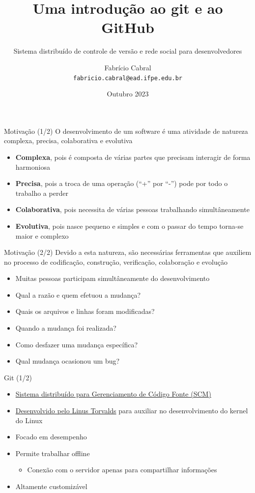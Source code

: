 \documentclass[aspectratio=169,14pt]{beamer}
\title{Uma introdução ao git e ao GitHub}
\subtitle{Sistema distribuído de controle de versão e rede social para
desenvolvedores}
\date{Outubro 2023}
\author[Fabrício Cabral]{
    Fabrício Cabral\texorpdfstring{\\\texttt{fabricio.cabral@ead.ifpe.edu.br}}{}
}
\institute{IFPE}
\begin{document}
\titlepage

\begin{frame}{Motivação (1/2)}
O desenvolvimento de um software é uma atividade de natureza complexa, precisa,
colaborativa e evolutiva
\begin{itemize}
    \item \textbf{Complexa}, pois é composta de várias partes que precisam
    interagir de forma harmoniosa
    \item \textbf{Precisa}, pois a troca de uma operação (``+'' por ``-'') pode
    por todo o trabalho a perder
    \item \textbf{Colaborativa}, pois necessita de várias pessoas trabalhando
    simultâneamente
    \item \textbf{Evolutiva}, pois nasce pequeno e simples e com o passar do
    tempo torna-se maior e complexo        
\end{itemize}
\end{frame}

\begin{frame}{Motivação (2/2)}
Devido a esta natureza, são necessárias ferramentas que auxiliem no processo de
codificação, construção, verificação, colaboração e evolução
\begin{itemize}
    \item Muitas pessoas participam simultâneamente do desenvolvimento
    \item Qual a razão e quem efetuou a mudança?
    \item Quais os arquivos e linhas foram modificadas?
    \item Quando a mudança foi realizada?
    \item Como desfazer uma mudança específica?
    \item Qual mudança ocasionou um bug?
\end{itemize}
\end{frame}

\begin{frame}{Git (1/2)}
    \begin{itemize}
        \item \href{https://git-scm.com}{Sistema distribuído para Gerenciamento
        de Código Fonte (SCM)}
        \item
        \href{https://www.atlassian.com/git/articles/10-years-of-git}{Desenvolvido
        pelo Linus Torvalds} para auxiliar no desenvolvimento do kernel do Linux
        \item Focado em desempenho
        \item Permite trabalhar offline
        \begin{itemize}
            \item Conexão com o servidor apenas para compartilhar informações
        \end{itemize}
        \item Altamente customizável
    \end{itemize}    
\end{frame}
\end{document}
